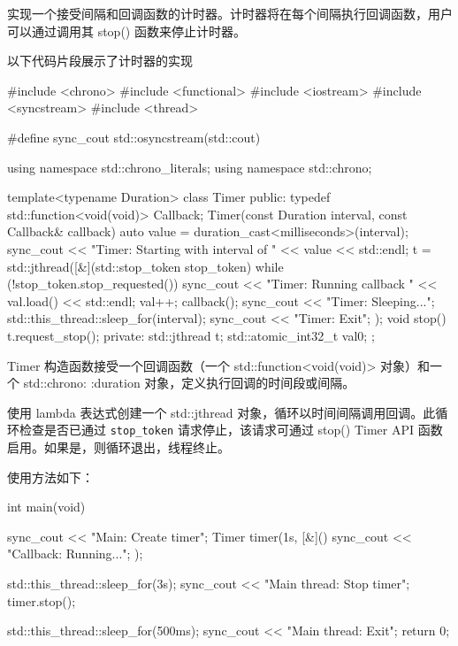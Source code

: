 

实现一个接受间隔和回调函数的计时器。计时器将在每个间隔执行回调函数，用户可以通过调用其 stop() 函数来停止计时器。

以下代码片段展示了计时器的实现

\begin{cpp}
#include <chrono>
#include <functional>
#include <iostream>
#include <syncstream>
#include <thread>

#define sync_cout std::osyncstream(std::cout)

using namespace std::chrono_literals;
using namespace std::chrono;

template<typename Duration>
class Timer {
    public:
    typedef std::function<void(void)> Callback;
    Timer(const Duration interval,
          const Callback& callback) {
        auto value = duration_cast<milliseconds>(interval);
        sync_cout << "Timer: Starting with interval of "
                  << value << std::endl;
        t = std::jthread([&](std::stop_token stop_token) {
            while (!stop_token.stop_requested()) {
                sync_cout << "Timer: Running callback "
                          << val.load() << std::endl;
                val++;
                callback();
                sync_cout << "Timer: Sleeping...\n";
                std::this_thread::sleep_for(interval);
            }
            sync_cout << "Timer: Exit\n";
        });
    }
    void stop() {
        t.request_stop();
    }
    private:
    std::jthread t;
    std::atomic_int32_t val{0};
};
\end{cpp}

Timer 构造函数接受一个回调函数（一个 std::function<void(void)> 对象）和一个 std::chrono: :duration 对象，定义执行回调的时间段或间隔。

使用 lambda 表达式创建一个 std::jthread 对象，循环以时间间隔调用回调。此循环检查是否已通过 \verb|stop_token| 请求停止，该请求可通过 stop() Timer API 函数启用。如果是，则循环退出，线程终止。

使用方法如下：

\begin{cpp}
int main(void) {
    sync_cout << "Main: Create timer\n";
    Timer timer(1s, [&]() {
        sync_cout << "Callback: Running...\n";
    });

    std::this_thread::sleep_for(3s);
    sync_cout << "Main thread: Stop timer\n";
    timer.stop();

    std::this_thread::sleep_for(500ms);
    sync_cout << "Main thread: Exit\n";
    return 0;
}
\end{cpp}

